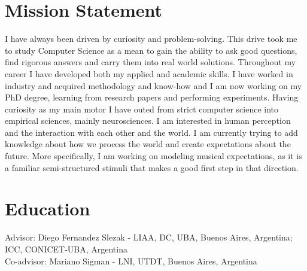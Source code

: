 \documentclass[a4paper]{deedy-resume} %
\begin{document}




\section{Mission Statement}

\begin{flushleft}
I have always been driven by curiosity and problem-solving. This drive took me
to study Computer Science as a mean to gain the ability to ask good
questions, find rigorous answers and carry them into real world solutions.
Throughout my career I have developed both my applied and academic skills. I
have worked in industry and acquired methodology and know-how and I am now
working on my PhD degree, learning from research papers and performing
experiments. Having curiosity as my main motor I have outed from strict
computer science into empirical sciences, mainly neurosciences. I am
interested in human perception and the interaction with each other and the
world. I am currently trying to add knowledge about how we process the world
and create expectations about the future. More specifically, I am working on
modeling musical expectations, as it is a familiar
semi-structured stimuli that makes a good first step in that direction.
\end{flushleft}


\section{Education} 

Advisor: Diego Fernandez Slezak - LIAA, DC, UBA, Buenos Aires, Argentina; ICC, CONICET-UBA, Argentina \\
Co-advisor: Mariano Sigman - LNI, UTDT, Buenos Aires, Argentina
\end{document}
